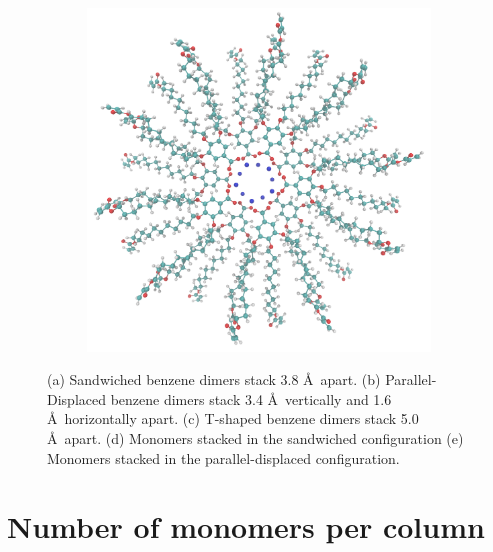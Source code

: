 \documentclass{article}
\newcommand{\angstrom}{\textup{\AA}}
\begin{document}
\begin{figure}[!htb]
\begin{subfigure}[b]{0.475\textwidth}
                \caption{}\label{fig:sandwichedlayers}
        \end{subfigure}
        \begin{subfigure}[b]{0.475\textwidth}
                \centering
                \includegraphics[width=\textwidth]{offsetlayers.png}
                \caption{}\label{fig:offsetlayers}
        \end{subfigure}
        \caption{(a) Sandwiched benzene dimers stack 3.8 \angstrom~apart. (b) Parallel-Displaced benzene dimers stack
        3.4 \angstrom~vertically and 1.6 \angstrom~horizontally apart. (c) T-shaped benzene dimers stack 5.0 \angstrom~apart.
        (d) Monomers stacked in the sandwiched configuration (e) Monomers stacked in the parallel-displaced
        configuration.}\label{fig:stacking}
  \end{figure}

  
  \section{Number of monomers per column}\label{section:monomers_per_column}
  
\end{document}
